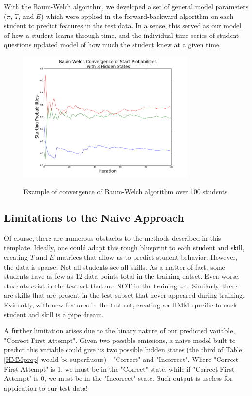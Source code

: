 \documentclass{article} %
\begin{document}
With the Baum-Welch algorithm, we developed a set of general model parameters ($\pi$, $T$, and $E$) which were applied in the forward-backward algorithm on each student to predict features in the test data. In a sense, this served as our model of how a student learns through time, and the individual time series of student questions updated model of how much the student knew at a given time.

\begin{figure}[h]
\begin{center}
	\includegraphics[width=0.8\textwidth]{bwConv3a.png}
	\label{fig:sgdbw}
\end{center}
\caption{Example of convergence of Baum-Welch algorithm over 100 students}
\end{figure}

\subsection{Limitations to the Naive Approach}

Of course, there are numerous obstacles to the methods described in this template. Ideally, one could adapt this rough blueprint to each student and skill, creating $T$ and $E$ matrices that allow us to predict student behavior. However, the data is sparse. Not all students see all skills. As a matter of fact, some students have as few as 12 data points total in the training datset. Even worse, students exist in the test set that are NOT in the training set. Similarly, there are skills that are present in the test subset that never appeared during training. Evidently, with new features in the test set, creating an HMM specific to each student and skill is a pipe dream.

A further limitation arises due to the binary nature of our predicted variable, "Correct First Attempt". Given two possible emissions, a naive model built to predict this variable could give us two possible hidden states (the third of Table \ref{HMMprop} would be superfluous) - "Correct" and "Incorrect". Where "Correct First Attempt" is 1, we must be in the "Correct" state, while if "Correct First Attempt" is 0, we must be in the "Incorrect" state. Such output is useless for application to our test data!
\end{document}
